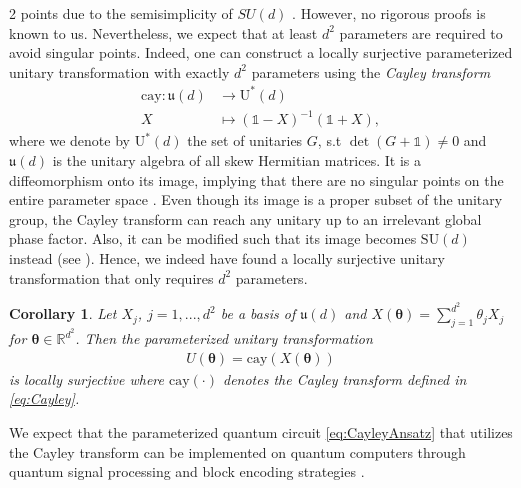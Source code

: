 \documentclass{article}
\renewcommand{\vec}[1]{\ensuremath{\boldsymbol{#1}}}
\newcommand{\RED}[1]{\textcolor{red}{#1}}
\newcommand{\ORANGE}[1]{\textcolor{orange}{#1}}
\newtheorem*{corollary*}{Corollary}
\begin{document}
\begin{multicols}{2}
points due to the semisimplicity of $SU(d)$ \cite{altafini_use_2002}.
However, no rigorous proofs is known 
to us. Nevertheless, we expect that at least \(d^2\) parameters are required to avoid singular points.
Indeed, one can construct a locally surjective parameterized unitary transformation with exactly \(d^2\) parameters using the \textit{Cayley transform}
\begin{align}
\label{eq:Cayley}
    \mathrm{cay}: \mathfrak{u}(d) &\rightarrow \mathrm{U}^*(d) \\
    X &\mapsto (\mathds{1}-X)^{-1}(\mathds{1} + X),
\end{align}
where we denote by \(\mathrm{U}^*(d)\) the set of unitaries \(G\), s.t \(\det(G + \mathds{1}) \neq 0\) and \(\mathfrak{u}(d)\) is the unitary algebra of all skew Hermitian matrices. It is a diffeomorphism onto its image, implying that there are no singular points on the entire parameter space \cite{quillen_superconnection_1988}. 
Even though its image is a proper subset of the unitary group, the Cayley transform can reach any unitary up to an irrelevant global phase factor. Also, it can be modified such that its image becomes \(\mathrm{SU}(d)\) instead (see ). Hence, we indeed have found a locally surjective unitary transformation that only requires \(d^2\) parameters. 

\begin{corollary*}
    Let \(X_j\), \(j=1,...,d^2\) be a basis of \(\mathfrak{u}(d)\) and \(X(\vec{\theta}) = \sum_{j=1}^{d^2}\theta_j X_j\) for \(\vec{\theta}\in \mathds{R}^{d^2}\). Then the parameterized unitary transformation 
    \begin{align}
    \label{eq:CayleyAnsatz}
        U(\vec{\theta})  = \mathrm{cay}(X(\vec{\theta}))
    \end{align}
    is locally surjective where $\text{cay}(\cdot)$ denotes the Cayley transform defined in \eqref{eq:Cayley}. 
\end{corollary*}

We expect that the parameterized quantum circuit \eqref{eq:CayleyAnsatz} that utilizes the Cayley transform can be implemented on quantum computers through quantum signal processing and block encoding strategies \cite{PhysRevLett.118.010501}.  


\end{multicols}
\end{document}
